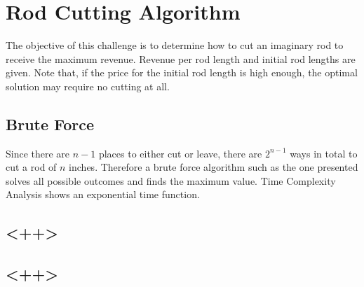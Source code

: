 \chapter{Rod Cutting Algorithm}
The objective of this challenge is to determine how to cut an imaginary rod to
receive the maximum revenue. Revenue per rod length and initial rod lengths are 
given. Note that, if the price for the initial rod length is high enough, the
optimal solution may require no cutting at all.

\section{Brute Force}

Since there are $n-1$ places to either cut or leave, there are $2^{n-1}$ ways in
total to cut a rod of $n$ inches. Therefore a brute force algorithm such as the
one presented solves all possible outcomes and finds the maximum value. Time
Complexity Analysis shows an exponential time function.

\section{<++>}

\section{<++>}
